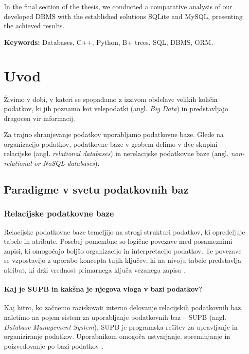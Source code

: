 \documentclass[a4paper,12pt,openright]{book}
\newcommand{\tkeywordsEn}{Databases, C++, Python, B+ trees, SQL, DBMS, ORM}
\newcommand{\clearemptydoublepage}{\newpage{\pagestyle{empty}\cleardoublepage}}
\begin{document}
In the final section of the thesis, we conducted a comparative analysis of our developed DBMS with the established solutions SQLite and MySQL, presenting the achieved results.
\bigskip

\noindent\textbf{Keywords:} \tkeywordsEn.
\clearemptydoublepage

\mainmatter
\setcounter{page}{1}
\pagestyle{fancy}

\chapter{Uvod}
    Živimo v dobi, v kateri se spopadamo z izzivom obdelave velikih količin podatkov, ki jih poznamo kot velepodatki (angl. \textit{Big Data}) in predstavljajo dragocen vir informacij.
    
    Za trajno shranjevanje podatkov uporabljamo podatkovne baze. Glede na organizacijo podatkov, podatkovne baze v grobem delimo v dve skupini – relacijske (angl. \textit{relational databases}) in nerelacijske podatkovne baze (angl. \textit{non-relational or NoSQL databases}).
    
    \section{Paradigme v svetu podatkovnih baz}
        \subsection{Relacijske podatkovne baze}
        Relacijske podatkovne baze temeljijo na strogi strukturi podatkov, ki opredeljuje tabele in atribute. Posebej pomembne so logične povezave med posameznimi zapisi, ki omogočajo boljšo organizacijo in interpretacijo podatkov. Te povezave se vzpostavijo z uporabo koncepta tujih ključev, ki na nivoju tabele predstavlja atribut, ki drži vrednost primarnega ključa vezanega zapisa \cite{connolly2005database}.

        \subsubsection{Kaj je SUPB in kakšna je njegova vloga v bazi podatkov?}

        Kaj hitro, ko začnemo raziskovati interno delovanje relacijskih podatkovnih baz, naletimo na pojem sistem za uporabljanje podatkovnih baz – SUPB (angl. \textit{Database Management System}). SUPB je programska rešitev za upravljanje in organiziranje podatkov. Uporabnikom omogoča ustvarjanje, spreminjanje in poizvedovanje po bazi podatkov \cite{connolly2005database}.
\end{document}
